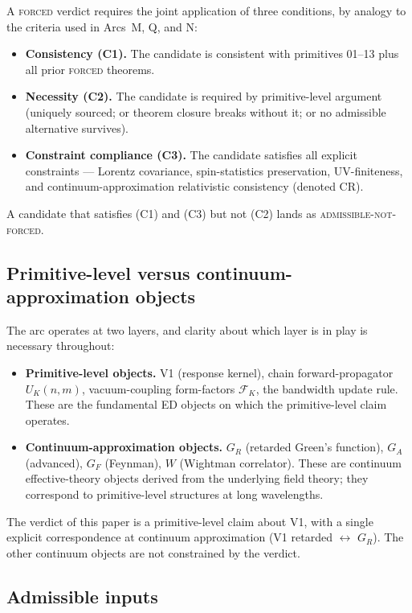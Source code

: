 \documentclass[11pt,a4paper]{article}
\begin{document}
A \textsc{forced} verdict requires the joint application of three conditions, by analogy to the criteria used in Arcs~M, Q, and N:
\begin{itemize}[leftmargin=1.5em]
  \item \textbf{Consistency (C1).} The candidate is consistent with primitives 01--13 plus all prior \textsc{forced} theorems.
  \item \textbf{Necessity (C2).} The candidate is required by primitive-level argument (uniquely sourced; or theorem closure breaks without it; or no admissible alternative survives).
  \item \textbf{Constraint compliance (C3).} The candidate satisfies all explicit constraints --- Lorentz covariance, spin-statistics preservation, UV-finiteness, and continuum-approximation relativistic consistency (denoted CR).
\end{itemize}

A candidate that satisfies (C1) and (C3) but not (C2) lands as \textsc{admissible-not-forced}.

\subsection{Primitive-level versus continuum-approximation objects}

The arc operates at two layers, and clarity about which layer is in play is necessary throughout:
\begin{itemize}[leftmargin=1.5em]
  \item \textbf{Primitive-level objects.} V1 (response kernel), chain forward-propagator $U_K(n,m)$, vacuum-coupling form-factors $\mathcal{F}_K$, the bandwidth update rule. These are the fundamental ED objects on which the primitive-level claim operates.
  \item \textbf{Continuum-approximation objects.} $G_R$ (retarded Green's function), $G_A$ (advanced), $G_F$ (Feynman), $W$ (Wightman correlator). These are continuum effective-theory objects derived from the underlying field theory; they correspond to primitive-level structures at long wavelengths.
\end{itemize}

The verdict of this paper is a primitive-level claim about V1, with a single explicit correspondence at continuum approximation (V1 retarded $\leftrightarrow$ $G_R$). The other continuum objects are not constrained by the verdict.

\subsection{Admissible inputs}
\end{document}
